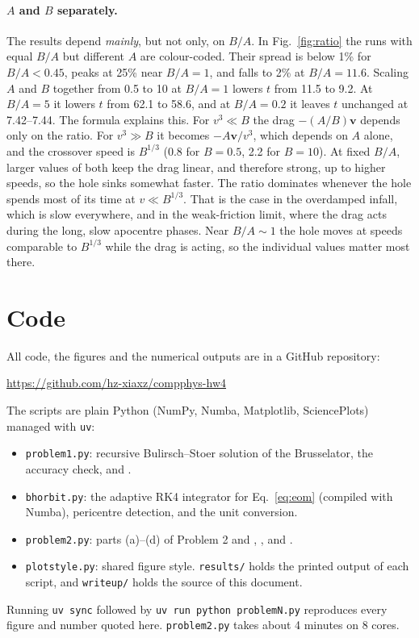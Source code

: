 \documentclass[11pt]{article}
\newcommand{\code}[1]{\texttt{#1}}
\begin{document}
\paragraph{$A$ and $B$ separately.} The results depend \emph{mainly}, but not
only, on $B/A$. In Fig.~\ref{fig:ratio} the runs with equal $B/A$ but different
$A$ are colour-coded. Their spread is below 1\% for $B/A<0.45$, peaks at 25\%
near $B/A=1$, and falls to 2\% at $B/A=11.6$. Scaling $A$ and $B$ together
from 0.5 to 10 at $B/A=1$ lowers $t$ from 11.5 to 9.2. At $B/A=5$ it lowers $t$
from 62.1 to 58.6, and at $B/A=0.2$ it leaves $t$ unchanged at 7.42--7.44. The
formula explains this. For $v^3\ll B$ the drag $-(A/B)\mathbf v$ depends only
on the ratio. For $v^3\gg B$ it becomes $-A\mathbf v/v^3$, which depends on $A$
alone, and the crossover speed is $B^{1/3}$ (0.8 for $B=0.5$, 2.2 for $B=10$).
At fixed $B/A$, larger values of both keep the drag linear, and therefore
strong, up to higher speeds, so the hole sinks somewhat faster. The ratio
dominates whenever the hole spends most of its time at $v\ll B^{1/3}$. That is
the case in the overdamped infall, which is slow everywhere, and in the
weak-friction limit, where the drag acts during the long, slow apocentre
phases. Near $B/A\sim1$ the hole moves at speeds comparable to $B^{1/3}$ while
the drag is acting, so the individual values matter most there.

\section*{Code}

All code, the figures and the numerical outputs are in a GitHub repository:
\begin{center}
\url{https://github.com/hz-xiaxz/compphys-hw4}
\end{center}
The scripts are plain Python (NumPy, Numba, Matplotlib, SciencePlots) managed
with \code{uv}:
\begin{itemize}
\item \code{problem1.py}: recursive Bulirsch--Stoer solution of the
Brusselator, the accuracy check, and .
\item \code{bhorbit.py}: the adaptive RK4 integrator for
Eq.~\eqref{eq:eom} (compiled with Numba), pericentre detection, and the unit
conversion.
\item \code{problem2.py}: parts (a)--(d) of Problem 2 and
, ,
 and .
\item \code{plotstyle.py}: shared figure style. \code{results/} holds the
printed output of each script, and \code{writeup/} holds the source of this
document.
\end{itemize}
Running \code{uv sync} followed by \code{uv run python problemN.py} reproduces
every figure and number quoted here. \code{problem2.py} takes about 4 minutes on
8 cores.
\end{document}
